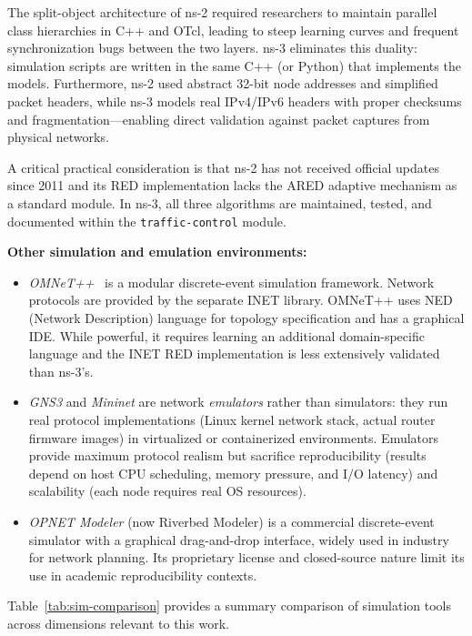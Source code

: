 \documentclass[default]{subfiles}
\begin{document}
{The split-object architecture of ns-2 required researchers to maintain parallel class hierarchies in C++ and OTcl, leading to steep learning curves and frequent synchronization bugs between the two layers. ns-3 eliminates this duality: simulation scripts are written in the same C++ (or Python) that implements the models. Furthermore, ns-2 used abstract 32-bit node addresses and simplified packet headers, while ns-3 models real IPv4/IPv6 headers with proper checksums and fragmentation---enabling direct validation against packet captures from physical networks.

A critical practical consideration is that ns-2 has not received official updates since 2011 and its RED implementation lacks the ARED adaptive mechanism as a standard module. In ns-3, all three algorithms are maintained, tested, and documented within the \texttt{traffic-control} module.

\textbf{Other simulation and emulation environments:}
\begin{itemize}
  \item \textit{OMNeT++}~\cite{omnetpp} is a modular discrete-event simulation framework. Network protocols are provided by the separate INET library. OMNeT++ uses NED (Network Description) language for topology specification and has a graphical IDE. While powerful, it requires learning an additional domain-specific language and the INET RED implementation is less extensively validated than ns-3's.
  \item \textit{GNS3} and \textit{Mininet} are network \textit{emulators} rather than simulators: they run real protocol implementations (Linux kernel network stack, actual router firmware images) in virtualized or containerized environments. Emulators provide maximum protocol realism but sacrifice reproducibility (results depend on host CPU scheduling, memory pressure, and I/O latency) and scalability (each node requires real OS resources).
  \item \textit{OPNET Modeler} (now Riverbed Modeler) is a commercial discrete-event simulator with a graphical drag-and-drop interface, widely used in industry for network planning. Its proprietary license and closed-source nature limit its use in academic reproducibility contexts.
\end{itemize}

Table~\ref{tab:sim-comparison} provides a summary comparison of simulation tools across dimensions relevant to this work.

}
\end{document}
